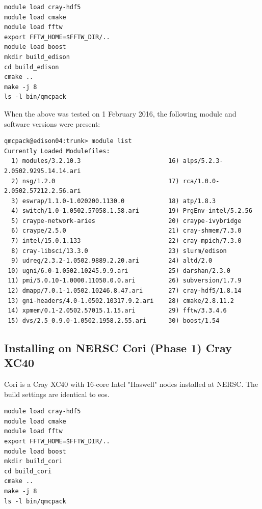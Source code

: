 \begin{verbatim}
module load cray-hdf5
module load cmake
module load fftw
export FFTW_HOME=$FFTW_DIR/..
module load boost
mkdir build_edison
cd build_edison
cmake ..
make -j 8  
ls -l bin/qmcpack 
\end{verbatim}
When the above was tested on 1 February 2016, the following module and
software versions were present:
\begin{verbatim}
qmcpack@edison04:trunk> module list
Currently Loaded Modulefiles:
  1) modules/3.2.10.3                        16) alps/5.2.3-2.0502.9295.14.14.ari      
  2) nsg/1.2.0                               17) rca/1.0.0-2.0502.57212.2.56.ari       
  3) eswrap/1.1.0-1.020200.1130.0            18) atp/1.8.3                             
  4) switch/1.0-1.0502.57058.1.58.ari        19) PrgEnv-intel/5.2.56                   
  5) craype-network-aries                    20) craype-ivybridge                      
  6) craype/2.5.0                            21) cray-shmem/7.3.0                      
  7) intel/15.0.1.133                        22) cray-mpich/7.3.0                     
  8) cray-libsci/13.3.0                      23) slurm/edison                         
  9) udreg/2.3.2-1.0502.9889.2.20.ari        24) altd/2.0                             
 10) ugni/6.0-1.0502.10245.9.9.ari           25) darshan/2.3.0                        
 11) pmi/5.0.10-1.0000.11050.0.0.ari         26) subversion/1.7.9                     
 12) dmapp/7.0.1-1.0502.10246.8.47.ari       27) cray-hdf5/1.8.14                     
 13) gni-headers/4.0-1.0502.10317.9.2.ari    28) cmake/2.8.11.2                       
 14) xpmem/0.1-2.0502.57015.1.15.ari         29) fftw/3.3.4.6                         
 15) dvs/2.5_0.9.0-1.0502.1958.2.55.ari      30) boost/1.54                           
\end{verbatim}

\subsection{Installing on NERSC Cori (Phase 1) Cray XC40}
Cori is a Cray XC40 with 16-core Intel "Haswell" nodes 
installed at NERSC. The build settings are identical to eos. 

\begin{verbatim}
module load cray-hdf5
module load cmake
module load fftw
export FFTW_HOME=$FFTW_DIR/..
module load boost
mkdir build_cori
cd build_cori
cmake ..
make -j 8  
ls -l bin/qmcpack 
\end{verbatim}

